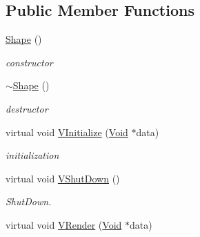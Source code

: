 \subsection*{Public Member Functions}
\begin{DoxyCompactItemize}
\item 
\hypertarget{classContent_1_1Shape_1_1Admin_1_1Shape_a7ed4668c2dd6a2a28c2f91e00ab8da2b}{
\hyperlink{classContent_1_1Shape_1_1Admin_1_1Shape_a7ed4668c2dd6a2a28c2f91e00ab8da2b}{Shape} ()}
\label{classContent_1_1Shape_1_1Admin_1_1Shape_a7ed4668c2dd6a2a28c2f91e00ab8da2b}

\begin{DoxyCompactList}\small\item\em constructor \item\end{DoxyCompactList}\item 
\hypertarget{classContent_1_1Shape_1_1Admin_1_1Shape_a2cde27986f66b74088fb378f857fa000}{
\hyperlink{classContent_1_1Shape_1_1Admin_1_1Shape_a2cde27986f66b74088fb378f857fa000}{$\sim$Shape} ()}
\label{classContent_1_1Shape_1_1Admin_1_1Shape_a2cde27986f66b74088fb378f857fa000}

\begin{DoxyCompactList}\small\item\em destructor \item\end{DoxyCompactList}\item 
\hypertarget{classContent_1_1Shape_1_1Admin_1_1Shape_ae49439bc5bfa37b370ed53b99268aa69}{
virtual void \hyperlink{classContent_1_1Shape_1_1Admin_1_1Shape_ae49439bc5bfa37b370ed53b99268aa69}{VInitialize} (\hyperlink{structVoid}{Void} $\ast$data)}
\label{classContent_1_1Shape_1_1Admin_1_1Shape_ae49439bc5bfa37b370ed53b99268aa69}

\begin{DoxyCompactList}\small\item\em initialization \item\end{DoxyCompactList}\item 
\hypertarget{classContent_1_1Shape_1_1Admin_1_1Shape_a849d5a80bbed170ee6fe5b39ae8c24ed}{
virtual void \hyperlink{classContent_1_1Shape_1_1Admin_1_1Shape_a849d5a80bbed170ee6fe5b39ae8c24ed}{VShutDown} ()}
\label{classContent_1_1Shape_1_1Admin_1_1Shape_a849d5a80bbed170ee6fe5b39ae8c24ed}

\begin{DoxyCompactList}\small\item\em ShutDown. \item\end{DoxyCompactList}\item 
\hypertarget{classContent_1_1Shape_1_1Admin_1_1Shape_ae9b64e57e31e76772b563363c7e1a90f}{
virtual void \hyperlink{classContent_1_1Shape_1_1Admin_1_1Shape_ae9b64e57e31e76772b563363c7e1a90f}{VRender} (\hyperlink{structVoid}{Void} $\ast$data)}
\label{classContent_1_1Shape_1_1Admin_1_1Shape_ae9b64e57e31e76772b563363c7e1a90f}


\end{DoxyCompactItemize}
